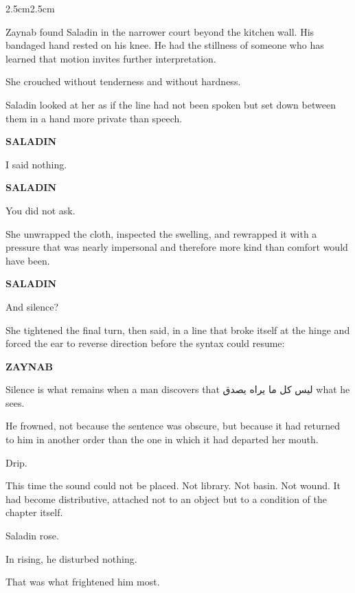 \begin{adjustwidth}{2.5cm}{2.5cm}

Zaynab found Saladin in the narrower court beyond the kitchen wall. His bandaged
hand rested on his knee. He had the stillness of someone who has learned that motion
invites further interpretation.

She crouched without tenderness and without hardness.

\medskip


\medskip

Saladin looked at her as if the line had not been spoken but set down between them
in a hand more private than speech.

\medskip

\textbf{SALADIN}

I said nothing.

\medskip


\medskip

\textbf{SALADIN}

You did not ask.

\medskip

She unwrapped the cloth, inspected the swelling, and rewrapped it with a pressure
that was nearly impersonal and therefore more kind than comfort would have been.

\medskip

\textbf{SALADIN}

And silence?

\medskip

She tightened the final turn, then said, in a line that broke itself at the hinge and
forced the ear to reverse direction before the syntax could resume:

\medskip

\textbf{ZAYNAB}

Silence is what remains when a man discovers that
{\AmiriFont ليس كل ما يراه يصدق}
what he sees.

\medskip

He frowned, not because the sentence was obscure, but because it had returned to
him in another order than the one in which it had departed her mouth.

\medskip

Drip.

\medskip

This time the sound could not be placed. Not library. Not basin. Not wound. It had
become distributive, attached not to an object but to a condition of the chapter itself.

Saladin rose.

In rising, he disturbed nothing.

That was what frightened him most.

\end{adjustwidth}
